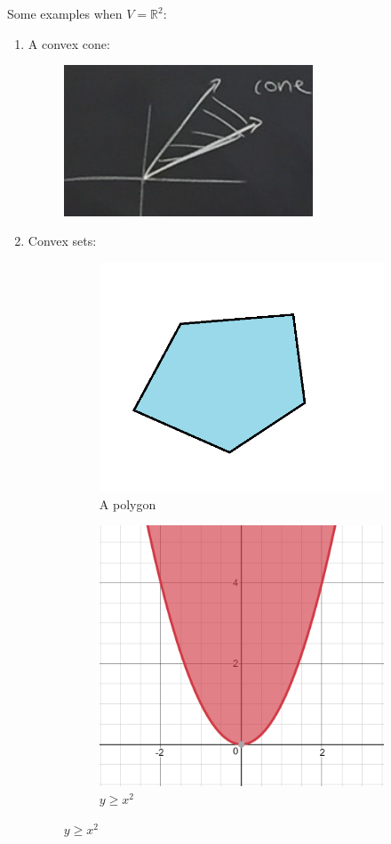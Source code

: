\documentclass[a4paper,12pt]{amsart}
\newcommand{\RR}{\mathbb{R}}
\begin{document}
\begin{Eg}Some examples when $V=\RR^2$:
\begin{enumerate}
\item A convex cone:
\begin{figure}[h]
\centering
\includegraphics[width=0.7\textwidth]{pic/lec01pic02a}
\end{figure}
\item Convex sets:
\begin{figure}[h]
\centering
\begin{subfigure}{.5\textwidth}
  \centering
  \includegraphics[width=.7\linewidth]{pic/lec01pic02b}
  \caption{A polygon}
  \label{fig:sub1}
\end{subfigure}%
\begin{subfigure}{.5\textwidth}
  \centering
  \includegraphics[width=.7\linewidth]{pic/lec01pic02c}
  \caption{$y\geq x^2$}
  \label{fig:sub2}
\end{subfigure}
\label{fig:test}
\end{figure}
\end{enumerate}
\end{Eg}
\end{document}
